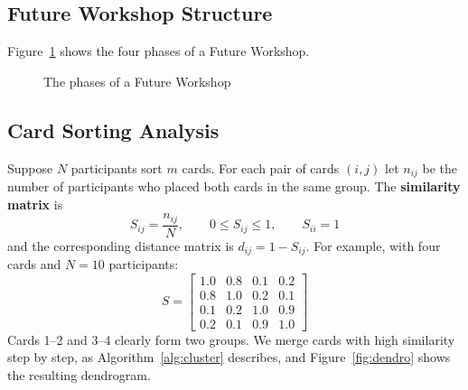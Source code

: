 \documentclass[a4paper,12pt]{article}
\begin{document}
\subsection{Future Workshop Structure}
Figure~\ref{fig:future} shows the four phases of a Future Workshop.
\begin{figure}[H]
\centering
{}
\caption{The phases of a Future Workshop}
\label{fig:future}
\end{figure}

\subsection{Card Sorting Analysis}
Suppose $N$ participants sort $m$ cards. For each pair of cards $(i,j)$ let $n_{ij}$ be the number of participants who placed both cards in the same group. The \textbf{similarity matrix} is
\begin{equation}
    S_{ij} = \frac{n_{ij}}{N}, \qquad 0 \le S_{ij} \le 1, \qquad S_{ii} = 1
\end{equation}
and the corresponding distance matrix is $d_{ij} = 1 - S_{ij}$. For example, with four cards and $N=10$ participants:
\begin{equation}
    S = \begin{bmatrix}
        1.0 & 0.8 & 0.1 & 0.2 \\
        0.8 & 1.0 & 0.2 & 0.1 \\
        0.1 & 0.2 & 1.0 & 0.9 \\
        0.2 & 0.1 & 0.9 & 1.0
    \end{bmatrix}
\end{equation}
Cards 1--2 and 3--4 clearly form two groups. We merge cards with high similarity step by step, as Algorithm~\ref{alg:cluster} describes, and Figure~\ref{fig:dendro} shows the resulting dendrogram.
\end{document}
